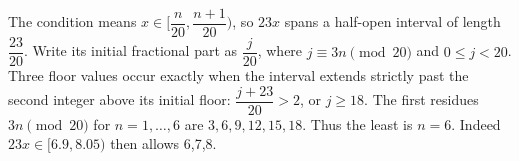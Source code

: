The condition means $x\in[\dfrac{n}{20},\dfrac{n+1}{20})$, so $23x$ spans a half-open interval of length $\dfrac{23}{20}$. Write its initial fractional part as $\dfrac{j}{20}$, where $j\equiv3n\pmod{20}$ and $0\le j<20$. Three floor values occur exactly when the interval extends strictly past the second integer above its initial floor: $\dfrac{j+23}{20}>2$, or $j\ge18$. The first residues $3n\pmod{20}$ for $n=1,\ldots,6$ are $3,6,9,12,15,18$. Thus the least is $\boxed{n=6}$. Indeed $23x\in[6.9,8.05)$ then allows 6,7,8.
